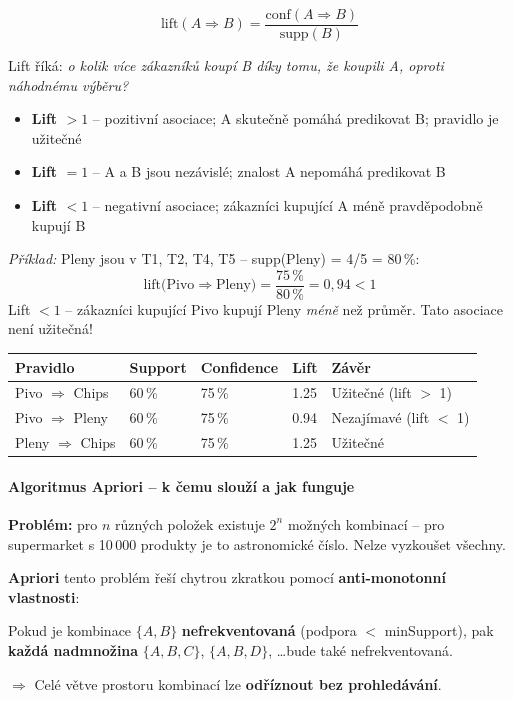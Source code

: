$$\text{lift}(A \Rightarrow B) = \frac{\text{conf}(A \Rightarrow B)}{\text{supp}(B)}$$

Lift říká: \textit{o kolik více zákazníků koupí B díky tomu, že koupili A, oproti náhodnému výběru?}
\begin{itemize}
  \item \textbf{Lift $> 1$} -- pozitivní asociace; A skutečně pomáhá predikovat B; pravidlo je užitečné
  \item \textbf{Lift $= 1$} -- A a B jsou nezávislé; znalost A nepomáhá predikovat B
  \item \textbf{Lift $< 1$} -- negativní asociace; zákazníci kupující A méně pravděpodobně kupují B
\end{itemize}

\textit{Příklad:} Pleny jsou v T1, T2, T4, T5 -- supp(Pleny) = 4/5 = 80\,\%:
$$\text{lift(Pivo} \Rightarrow \text{Pleny)} = \frac{75\,\%}{80\,\%} = 0{,}94 < 1$$
Lift $< 1$ -- zákazníci kupující Pivo kupují Pleny \textit{méně} než průměr. Tato asociace není užitečná!

\begin{center}\footnotesize
\begin{tabular}{lllll}
\toprule
\textbf{Pravidlo} & \textbf{Support} & \textbf{Confidence} & \textbf{Lift} & \textbf{Závěr} \\
\midrule
Pivo $\Rightarrow$ Chips & 60\,\% & 75\,\% & 1.25 & Užitečné (lift $>$ 1) \\
Pivo $\Rightarrow$ Pleny & 60\,\% & 75\,\% & 0.94 & Nezajímavé (lift $<$ 1) \\
Pleny $\Rightarrow$ Chips & 60\,\% & 75\,\% & 1.25 & Užitečné \\
\bottomrule
\end{tabular}
\end{center}

\paragraph{Algoritmus Apriori -- k čemu slouží a jak funguje}

\textbf{Problém:} pro $n$ různých položek existuje $2^n$ možných kombinací -- pro supermarket
s 10\,000 produkty je to astronomické číslo. Nelze vyzkoušet všechny.

\textbf{Apriori} tento problém řeší chytrou zkratkou pomocí \textbf{anti-monotonní vlastnosti}:

\begin{tcolorbox}[colback=yellow!15, colframe=orange!60, title=Anti-monotonní vlastnost (klíčová myšlenka Apriori)]
Pokud je kombinace $\{A, B\}$ \textbf{nefrekventovaná} (podpora $<$ minSupport),
pak \textbf{každá nadmnožina} $\{A, B, C\}$, $\{A, B, D\}$, \ldots bude také nefrekventovaná.

$\Rightarrow$ Celé větve prostoru kombinací lze \textbf{odříznout bez prohledávání}.
\end{tcolorbox}

